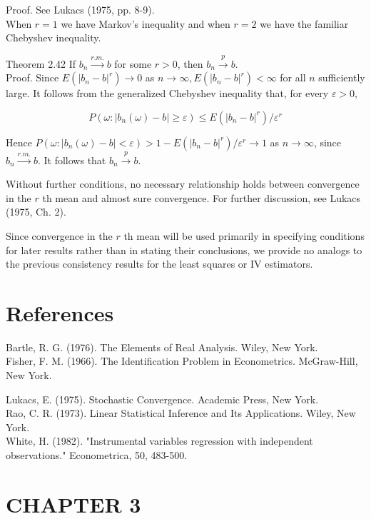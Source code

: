 \documentclass[10pt]{article}
\begin{document}
Proof. See Lukacs (1975, pp. 8-9).\\
When $r=1$ we have Markov's inequality and when $r=2$ we have the familiar Chebyshev inequality.

Theorem 2.42 If $b_{n} \xrightarrow{r . m .} b$ for some $r>0$, then $b_{n} \xrightarrow{p} b$.\\
Proof. Since $E\left(\left|b_{n}-b\right|^{r}\right) \rightarrow 0$ as $n \rightarrow \infty, E\left(\left|b_{n}-b\right|^{r}\right)<\infty$ for all $n$ sufficiently large. It follows from the generalized Chebyshev inequality that, for every $\varepsilon>0$,

$$
P\left(\omega:\left|b_{n}(\omega)-b\right| \geq \varepsilon\right) \leq E\left(\left|b_{n}-b\right|^{r}\right) / \varepsilon^{r}
$$

Hence $P\left(\omega:\left|b_{n}(\omega)-b\right|<\varepsilon\right)>1-E\left(\left|b_{n}-b\right|^{r}\right) / \varepsilon^{r} \rightarrow 1$ as $n \rightarrow \infty$, since $b_{n} \xrightarrow{r . m .} b$. It follows that $b_{n} \xrightarrow{p} b$.

Without further conditions, no necessary relationship holds between convergence in the $r$ th mean and almost sure convergence. For further discussion, see Lukacs (1975, Ch. 2).

Since convergence in the $r$ th mean will be used primarily in specifying conditions for later results rather than in stating their conclusions, we provide no analogs to the previous consistency results for the least squares or IV estimators.

\section*{References}
Bartle, R. G. (1976). The Elements of Real Analysis. Wiley, New York.\\
Fisher, F. M. (1966). The Identification Problem in Econometrics. McGraw-Hill, New York.

Lukacs, E. (1975). Stochastic Convergence. Academic Press, New York.\\
Rao, C. R. (1973). Linear Statistical Inference and Its Applications. Wiley, New York.\\
White, H. (1982). "Instrumental variables regression with independent observations." Econometrica, 50, 483-500.

\section*{CHAPTER 3}
\end{document}
